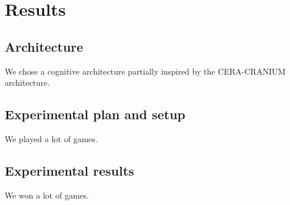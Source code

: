 \chapter{Results}

\section{Architecture}
We chose a cognitive architecture partially inspired by the CERA-CRANIUM
architecture.

\section{Experimental plan and setup}
We played a lot of games.


\section{Experimental results}
We won a lot of games.